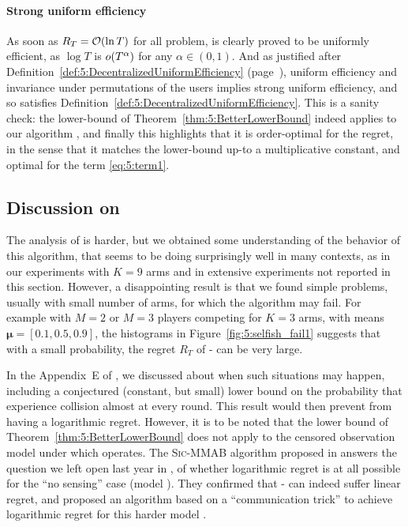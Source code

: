 \paragraph{Strong uniform efficiency}\label{app:5:JustifyingDefinition5}
%
As soon as $R_T = \mathop{}\mathopen{}\mathcal{O}\mathopen{}\left(\ln T\right)$ for all problem, \MCTopM{} is clearly proved
to be uniformly efficient, as $\log T$ is $\mathop{}\mathopen{}o\mathopen{}\left(T^{\alpha}\right)$ for any $\alpha\in(0,1)$.
%
And as justified after Definition~\ref{def:5:DecentralizedUniformEfficiency} (page~\pageref{def:5:DecentralizedUniformEfficiency}), uniform efficiency and invariance under permutations of the users implies strong uniform efficiency, and so \MCTopM{} satisfies Definition~\ref{def:5:DecentralizedUniformEfficiency}.
%
This is a sanity check: the lower-bound of
Theorem~\ref{thm:5:BetterLowerBound} indeed applies to our algorithm \MCTopM,
and finally this highlights that it is order-optimal for the regret, in the sense that it matches the lower-bound up-to a multiplicative constant,
and optimal for the term \ref{eq:5:term1}.


\subsection{Discussion on \Selfish} \label{sub:5:SelfishFails}

The analysis of \Selfish{} is harder, but we obtained some understanding of the behavior of this algorithm, that seems to be doing surprisingly well in many contexts, as in our experiments with $K=9$ arms and in extensive experiments not reported in this section. However, a disappointing result is that we found simple problems, usually with small number of arms, for which the algorithm may fail. For example with $M=2$ or $M=3$ players competing for $K=3$ arms,
with means $\boldsymbol{\mu} = [0.1, 0.5, 0.9]$, the histograms in Figure~\ref{fig:5:selfish_fail1} suggests that with a small probability, the regret $R_T$ of \Selfish-\klUCB{} can be very large.

In the Appendix~E of \cite{Besson2018ALT},
we discussed about when such situations may happen, including a conjectured (constant, but small) lower bound on the probability that \Selfish{} experience collision almost at every round. This result would then prevent \Selfish{} from having a logarithmic regret. However, it is to be noted that the lower bound of Theorem~\ref{thm:5:BetterLowerBound} does not apply to the censored observation model \modeltrois{} under which \Selfish{} operates.
%
The \textsc{Sic-MMAB} algorithm proposed in \cite{BoursierPerchet18} answers the question we left open last year in \cite{Besson2018ALT},
of whether logarithmic regret is at all possible for the ``no sensing'' case (model \modeltrois).
They confirmed that \Selfish-\UCB{} can indeed suffer linear regret, and proposed an algorithm based on a ``communication trick'' to achieve logarithmic regret for this harder model \modeltrois.



